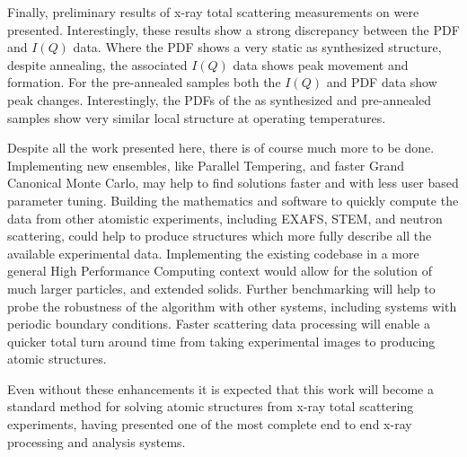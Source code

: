 Finally, preliminary results of x-ray total scattering measurements on  were presented.
Interestingly, these results show a strong discrepancy between the PDF and $I(Q)$ data.
Where the PDF shows a very static as synthesized structure, despite annealing, the associated $I(Q)$ data shows peak movement and formation.
For the pre-annealed samples both the $I(Q)$ and PDF data show peak changes.
Interestingly, the PDFs of the as synthesized and pre-annealed samples show very similar local structure at operating temperatures.

Despite all the work presented here, there is of course much more to be done.
Implementing new ensembles, like Parallel Tempering, and faster Grand Canonical Monte Carlo, may help to find solutions faster and with less user based parameter tuning.
Building the mathematics and software to quickly compute the data from other atomistic experiments, including EXAFS, STEM, and neutron scattering, could help to produce structures which more fully describe all the available experimental data.
Implementing the existing codebase in a more general High Performance Computing context would allow for the solution of much larger particles, and extended solids.
Further benchmarking will help to probe the robustness of the algorithm with other systems, including systems with periodic boundary conditions.
Faster scattering data processing will enable a quicker total turn around time from taking experimental images to producing atomic structures.

Even without these enhancements it is expected that this work will become a standard method for solving atomic structures from x-ray total scattering experiments, having presented one of the most complete end to end x-ray processing and analysis systems.